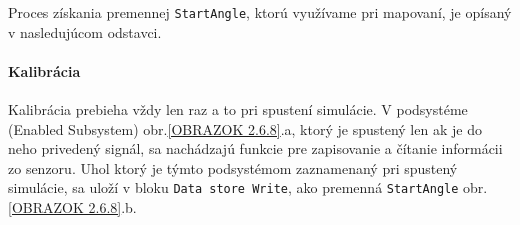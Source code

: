 Proces získania premennej \verb|StartAngle|, ktorú využívame pri mapovaní, je opísaný v nasledujúcom odstavci. 

\paragraph{Kalibrácia} 
Kalibrácia prebieha vždy len raz a to pri spustení simulácie. V podsystéme (Enabled Subsystem) obr.\ref{OBRAZOK 2.6.8}.a, ktorý je spustený len ak je do neho privedený signál, sa nachádzajú funkcie pre zapisovanie a čítanie informácii zo senzoru. Uhol ktorý je týmto podsystémom zaznamenaný pri spustený simulácie, sa uloží v bloku \verb|Data store Write|, ako premenná \verb|StartAngle| obr.\ref{OBRAZOK 2.6.8}.b.                                                                                                                                                                                                                                                                                                                                                                                                                                                                                                                                                                                                                                                                                                                                                                                                                                                                                                                                                                                                                                                                                                                                                                                                                                                                                                                                                                                                                                                                                                                                                                                                                                                                                                                                                                                                                                                                                                                                                                                                                                                                                                                                                                                                                                                                                                                                                                                                                                                                                                                                                                                                                                                             